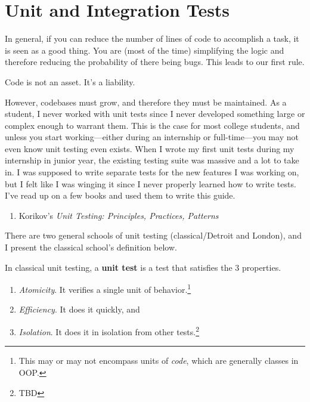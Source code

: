 \section{Unit and Integration Tests} 

  In general, if you can reduce the number of lines of code to accomplish a task, it is seen as a good thing. You are (most of the time) simplifying the logic and therefore reducing the probability of there being bugs. This leads to our first rule. 

  \begin{theorem}
    Code is not an asset. It's a liability. 
  \end{theorem}

  However, codebases must grow, and therefore they must be maintained. As a student, I never worked with unit tests since I never developed something large or complex enough to warrant them. This is the case for most college students, and unless you start working---either during an internship or full-time---you may not even know unit testing even exists. When I wrote my first unit tests during my internship in junior year, the existing testing suite was massive and a lot to take in. I was supposed to write separate tests for the new features I was working on, but I felt like I was winging it since I never properly learned how to write tests. I've read up on a few books and used them to write this guide. 
  \begin{enumerate}
    \item Korikov's \textit{Unit Testing: Principles, Practices, Patterns}
  \end{enumerate} 

  There are two general schools of unit testing (classical/Detroit and London), and I present the classical school's definition below. 

  \begin{definition}
    In classical unit testing, a \textbf{unit test} is a test that satisfies the 3 properties. 
    \begin{enumerate}
      \item \textit{Atomicity}. It verifies a single unit of behavior.\footnote{This may or may not encompass units of \textit{code}, which are generally classes in OOP. }
      \item \textit{Efficiency}. It does it quickly, and 
      \item \textit{Isolation}. It does it in isolation from other tests.\footnote{TBD}
    \end{enumerate}
  \end{definition}

